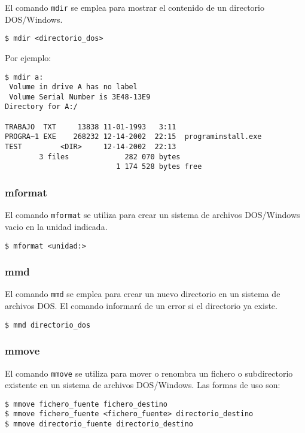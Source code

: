 El  comando {\tt  mdir}  se emplea  para mostrar  el  contenido de  un
directorio DOS/Windows.

\begin{verbatim}
$ mdir <directorio_dos>
\end{verbatim}

Por ejemplo:

\begin{verbatim}
$ mdir a:
 Volume in drive A has no label
 Volume Serial Number is 3E48-13E9
Directory for A:/

TRABAJO  TXT     13838 11-01-1993   3:11
PROGRA~1 EXE    268232 12-14-2002  22:15  programinstall.exe
TEST         <DIR>     12-14-2002  22:13
        3 files             282 070 bytes
                          1 174 528 bytes free
\end{verbatim}

\subsubsection{mformat}

El comando {\tt mformat} se utiliza  para crear un sistema de archivos
DOS/Windows vacio en la unidad indicada.

\begin{verbatim}
$ mformat <unidad:>
\end{verbatim}

\subsubsection{mmd}

El comando  {\tt mmd} se emplea  para crear un nuevo  directorio en un
sistema  de archivos  DOS.  El comando  informará de  un  error si  el
directorio ya existe.

\begin{verbatim}
$ mmd directorio_dos
\end{verbatim}

\subsubsection{mmove}

El comando {\tt  mmove} se utiliza para mover o  renombra un fichero o
subdirectorio  existente en  un sistema  de archivos  DOS/Windows. Las
formas de uso son:

\begin{verbatim} 
$ mmove fichero_fuente fichero_destino
$ mmove fichero_fuente <fichero_fuente> directorio_destino
$ mmove directorio_fuente directorio_destino
\end{verbatim}

